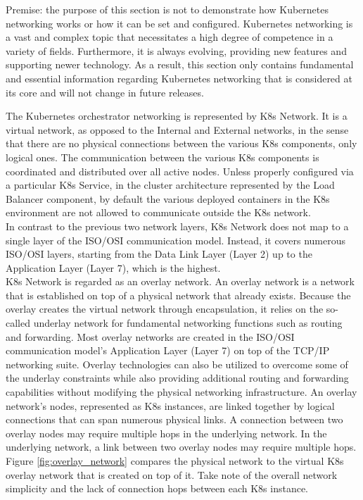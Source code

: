 Premise: the purpose of this section is not to demonstrate how Kubernetes networking
works or how it can be set and configured. Kubernetes networking is a vast and
complex topic that necessitates a high degree of competence in a variety of
fields. Furthermore, it is always evolving, providing new features and supporting
newer technology. As a result, this section only contains fundamental and essential
information regarding Kubernetes networking that is considered at its core and will
not change in future releases.

The Kubernetes orchestrator networking is represented by K8s Network. It is a
virtual network, as opposed to the Internal and External networks, in the sense
that there are no physical connections between the various K8s components, only logical
ones. The communication between the various K8s components is coordinated and
distributed over all active nodes. Unless properly configured via a particular K8s
Service, in the cluster architecture represented by the Load Balancer component,
by default the various deployed containers in the K8s environment are not allowed
to communicate outside the K8s network. \\ %
In contrast to the previous two network layers, K8s Network does not map to a
single layer of the ISO/OSI communication model. Instead, it covers numerous ISO/OSI
layers, starting from the Data Link Layer (Layer 2) up to the Application Layer (Layer
7), which is the highest. \\ %
K8s Network is regarded as an overlay network. An overlay network is a network that
is established on top of a physical network that already exists. Because the
overlay creates the virtual network through encapsulation, it relies on the so-called
underlay network for fundamental networking functions such as routing and forwarding.
Most overlay networks are created in the ISO/OSI communication model's
Application Layer (Layer 7) on top of the TCP/IP networking suite. Overlay technologies
can also be utilized to overcome some of the underlay constraints while also providing
additional routing and forwarding capabilities without modifying the physical networking
infrastructure. An overlay network's nodes, represented as K8s instances, are
linked together by logical connections that can span numerous physical links. A connection
between two overlay nodes may require multiple hops in the underlying network.
In the underlying network, a link between two overlay nodes may require multiple
hops. Figure \ref{fig:overlay_network} compares the physical network to the
virtual K8s overlay network that is created on top of it. Take note of the overall
network simplicity and the lack of connection hops between each K8s instance.

